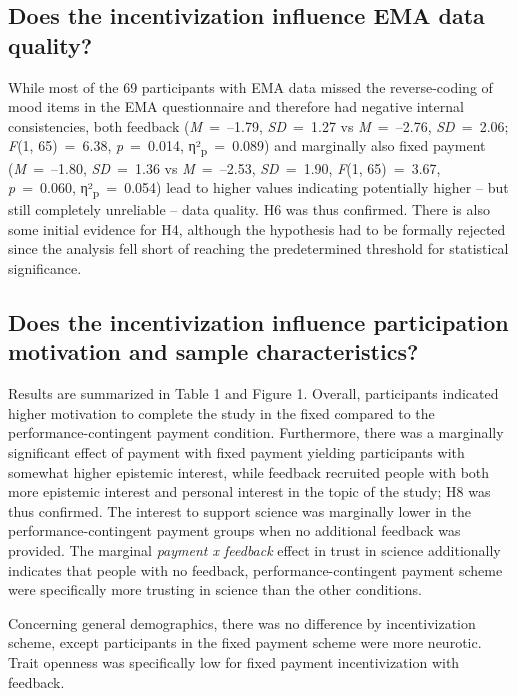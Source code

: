 \documentclass[authordate, empirical]{jote-new-article}
\begin{document}
	\subsection{Does the incentivization influence EMA data quality?}



	While most of the 69 participants with EMA data missed the reverse-coding of mood items in the EMA questionnaire and therefore had negative internal consistencies, both feedback (\emph{M }= --1.79, \emph{SD }= 1.27 vs \emph{M }= --2.76, \emph{SD }= 2.06; \emph{F}(1, 65) = 6.38, \emph{p} = 0.014, η²\textsubscript{p} = 0.089) and marginally also fixed payment (\emph{M }= --1.80, \emph{SD }= 1.36 vs \emph{M }= --2.53, \emph{SD }= 1.90, \emph{F}(1, 65) = 3.67, \emph{p} = 0.060, η²\textsubscript{p} = 0.054) lead to higher values indicating potentially higher -- but still completely unreliable -- data quality. H6 was thus confirmed. There is also some initial evidence for H4, although the hypothesis had to be formally rejected since the analysis fell short of reaching the predetermined threshold for statistical significance.



	\subsection{Does the incentivization influence participation motivation and sample characteristics?}



	Results are summarized in Table 1 and Figure 1. Overall, participants indicated higher motivation to complete the study in the fixed compared to the performance-contingent payment condition. Furthermore, there was a marginally significant effect of payment with fixed payment yielding participants with somewhat higher epistemic interest, while feedback recruited people with both more epistemic interest and personal interest in the topic of the study; H8 was thus confirmed. The interest to support science was marginally lower in the performance-contingent payment groups when no additional feedback was provided. The marginal \emph{payment x feedback }effect in trust in science additionally indicates that people with no feedback, performance-contingent payment scheme were specifically more trusting in science than the other conditions.



	Concerning general demographics, there was no difference by incentivization scheme, except participants in the fixed payment scheme were more neurotic. Trait openness was specifically low for fixed payment incentivization with feedback.
\end{document}
